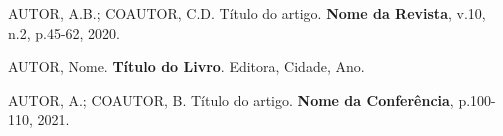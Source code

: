 
AUTOR, A.B.; COAUTOR, C.D. 
Título do artigo. {\bf Nome da Revista}, v.10, n.2, 
p.45-62, 2020.

AUTOR, Nome. 
{\bf Título do Livro}. Editora, Cidade, Ano.

AUTOR, A.; COAUTOR, B.
Título do artigo. {\bf Nome da Conferência}, 
p.100-110, 2021.

